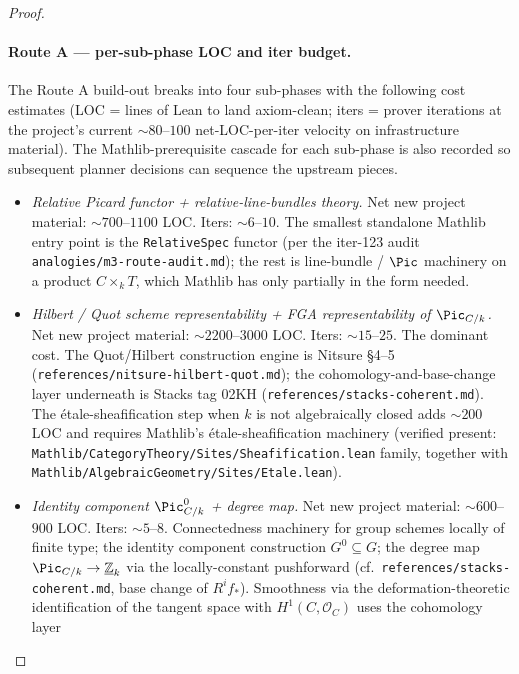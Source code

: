 \begin{proof}
  \paragraph{Route A --- per-sub-phase LOC and iter budget.}
  The Route A build-out breaks into four sub-phases with the following cost
  estimates (LOC = lines of Lean to land axiom-clean; iters = prover iterations
  at the project's current \(\sim 80\)--\(100\) net-LOC-per-iter velocity on
  infrastructure material). The Mathlib-prerequisite cascade for each
  sub-phase is also recorded so subsequent planner decisions can sequence the
  upstream pieces.
  \begin{itemize}
    \item[(A.1)] \emph{Relative Picard functor + relative-line-bundles
      theory.} Net new project material: \(\sim 700\)--\(1100\) LOC. Iters:
      \(\sim 6\)--\(10\). The smallest standalone Mathlib entry point is the
      \texttt{RelativeSpec} functor (per the iter-123 audit
      \texttt{analogies/m3-route-audit.md}); the rest is line-bundle / \(\Pic\)
      machinery on a product \(C \times_k T\), which Mathlib has only partially
      in the form needed.
    \item[(A.2)] \emph{Hilbert / Quot scheme representability + FGA
      representability of \(\Pic_{C/k}\).} Net new project material:
      \(\sim 2200\)--\(3000\) LOC. Iters: \(\sim 15\)--\(25\). The dominant cost.
      The Quot/Hilbert construction engine is Nitsure \S 4--5
      (\texttt{references/nitsure-hilbert-quot.md}); the cohomology-and-base-change
      layer underneath is Stacks tag 02KH
      (\texttt{references/stacks-coherent.md}). The \'etale-sheafification
      step when \(k\) is not algebraically closed adds \(\sim 200\) LOC and
      requires Mathlib's \'etale-sheafification machinery (verified present:
      \texttt{Mathlib/CategoryTheory/Sites/Sheafification.lean} family,
      together with \texttt{Mathlib/AlgebraicGeometry/Sites/Etale.lean}).
    \item[(A.3)] \emph{Identity component \(\Pic^0_{C/k}\) + degree map.}
      Net new project material: \(\sim 600\)--\(900\) LOC. Iters: \(\sim 5\)--\(8\).
      Connectedness machinery for group schemes locally of finite type; the
      identity component construction \(G^0 \subseteq G\); the degree map
      \(\Pic_{C/k} \to \underline{\mathbb Z}_k\) via the locally-constant
      pushforward (cf.\ \texttt{references/stacks-coherent.md}, base change of
      \(R^i f_*\)). Smoothness via the deformation-theoretic identification of
      the tangent space with \(H^1(C, \mathcal O_C)\) uses the cohomology layer

\end{itemize}
\end{proof}
